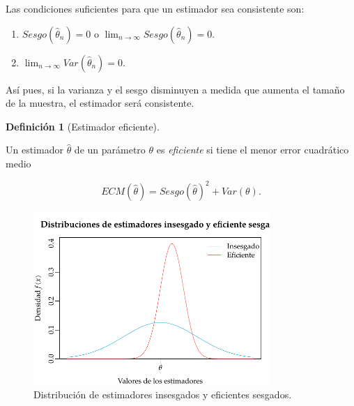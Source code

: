 \documentclass[
  a4paper,
]{scrreport}
\providecommand{\tightlist}{%
  \setlength{\itemsep}{0pt}\setlength{\parskip}{0pt}}\usepackage{longtable,booktabs,array}
\theoremstyle{plain}
\theoremstyle{definition}
\theoremstyle{definition}
\newtheorem{definition}{Definición}[chapter]
\theoremstyle{remark}
\begin{document}
\begin{figure}
\begin{minipage}{0.50\linewidth}
\end{minipage}%

\end{figure}%

Las condiciones suficientes para que un estimador sea consistente son:

\begin{enumerate}
\def\labelenumi{\arabic{enumi}.}
\tightlist
\item
  \(Sesgo(\hat \theta_n)=0\) o
  \(\lim_{n\rightarrow \infty}Sesgo(\hat \theta_n)=0\).
\item
  \(\lim_{n\rightarrow \infty}Var(\hat \theta_n)=0\).
\end{enumerate}

Así pues, si la varianza y el sesgo disminuyen a medida que aumenta el
tamaño de la muestra, el estimador será consistente.

\begin{definition}[Estimador
eficiente]\protect\hypertarget{def-estimador-eficiente}{}\label{def-estimador-eficiente}

Un estimador \(\hat \theta\) de un parámetro \(\theta\) es
\emph{eficiente} si tiene el menor error cuadrático medio

\[
ECM(\hat \theta) = Sesgo(\hat \theta)^2+Var(\theta).
\]

\end{definition}

\begin{figure}[H]

{\centering \includegraphics[width=0.8\textwidth,height=\textheight]{img/estimacion/estimador-eficiente-sesgado.pdf}

}

\caption{Distribución de estimadores insesgados y eficientes sesgados.}

\end{figure}%
\end{document}
